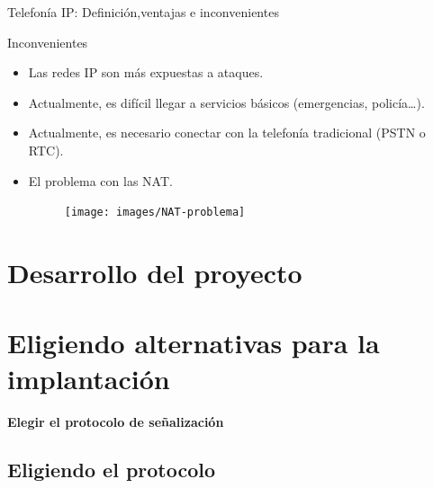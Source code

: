 \documentclass{beamer}
\begin{document}
\begin{frame}{Telefonía IP: Definición,ventajas e inconvenientes}
  \begin{block}{Inconvenientes}
    \begin{itemize}
    \item Las redes IP son más expuestas a ataques.
    \item Actualmente, es difícil llegar a servicios básicos (emergencias, policía\ldots).
    \item Actualmente, es necesario conectar con la telefonía tradicional (PSTN o RTC).
    \item El problema con las NAT.
      \begin{figure}[!h]
        \centering
        \texttt{[image: images/NAT-problema]}
      \end{figure}
    \end{itemize}
  \end{block}
\end{frame}

\section{Desarrollo del proyecto}
\label{sec:desarr-del-proy}


\section{Eligiendo alternativas para la implantación}

\begin{frame}
  \begin{center}
    \huge{\textbf{Elegir el protocolo de señalización}}
  \end{center}
\end{frame}

\subsection{Eligiendo el protocolo}
\label{sec:elig-el-prot}
\end{document}
